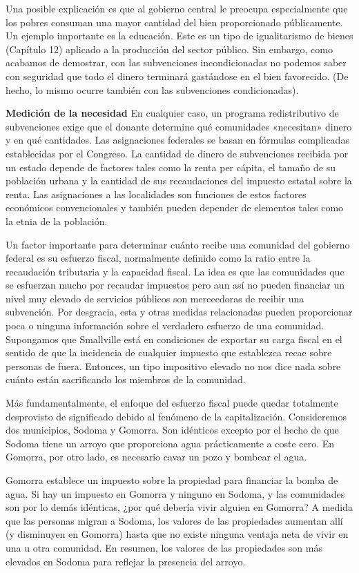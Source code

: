 \documentclass[10pt,a4paper]{article}
\begin{document}
Una posible explicación es que al gobierno central le preocupa especialmente que los pobres consuman una mayor cantidad del bien proporcionado públicamente. Un ejemplo importante es la educación. Este es un tipo de igualitarismo de bienes (Capítulo 12) aplicado a la producción del sector público. Sin embargo, como acabamos de demostrar, con las subvenciones incondicionadas no podemos saber con seguridad que todo el dinero terminará gastándose en el bien favorecido. (De hecho, lo mismo ocurre también con las subvenciones condicionadas).

\textbf{Medición de la necesidad} 
En cualquier caso, un programa redistributivo de subvenciones exige que el donante determine qué comunidades «necesitan» dinero y en qué cantidades. Las asignaciones federales se basan en fórmulas complicadas establecidas por el Congreso. La cantidad de dinero de subvenciones recibida por un estado depende de factores tales como la renta per cápita, el tamaño de su población urbana y la cantidad de sus recaudaciones del impuesto estatal sobre la renta. Las asignaciones a las localidades son funciones de estos factores económicos convencionales y también pueden depender de elementos tales como la etnia de la población.

Un factor importante para determinar cuánto recibe una comunidad del gobierno federal es su esfuerzo fiscal, normalmente definido como la ratio entre la recaudación tributaria y la capacidad fiscal. La idea es que las comunidades que se esfuerzan mucho por recaudar impuestos pero aun así no pueden financiar un nivel muy elevado de servicios públicos son merecedoras de recibir una subvención. Por desgracia, esta y otras medidas relacionadas pueden proporcionar poca o ninguna información sobre el verdadero esfuerzo de una comunidad. Supongamos que Smallville está en condiciones de exportar su carga fiscal en el sentido de que la incidencia de cualquier impuesto que establezca recae sobre personas de fuera. Entonces, un tipo impositivo elevado no nos dice nada sobre cuánto están sacrificando los miembros de la comunidad.

Más fundamentalmente, el enfoque del esfuerzo fiscal puede quedar totalmente desprovisto de significado debido al fenómeno de la capitalización. Consideremos dos municipios, Sodoma y Gomorra. Son idénticos excepto por el hecho de que Sodoma tiene un arroyo que proporciona agua prácticamente a coste cero. En Gomorra, por otro lado, es necesario cavar un pozo y bombear el agua.

Gomorra establece un impuesto sobre la propiedad para financiar la bomba de agua. Si hay un impuesto en Gomorra y ninguno en Sodoma, y las comunidades son por lo demás idénticas, ¿por qué debería vivir alguien en Gomorra? A medida que las personas migran a Sodoma, los valores de las propiedades aumentan allí (y disminuyen en Gomorra) hasta que no existe ninguna ventaja neta de vivir en una u otra comunidad. En resumen, los valores de las propiedades son más elevados en Sodoma para reflejar la presencia del arroyo.
\end{document}

